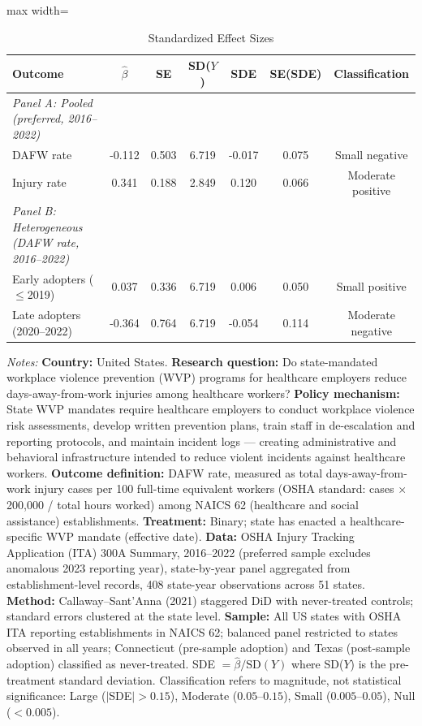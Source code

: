 \begin{table}[htbp]
\centering
\caption{Standardized Effect Sizes}
\label{tab:sde}
\begin{adjustbox}{max width=\textwidth}
\begin{tabular}{lcccccc}
\toprule
Outcome & $\hat{\beta}$ & SE & SD($Y$) & SDE & SE(SDE) & Classification \\
\midrule
\textit{Panel A: Pooled (preferred, 2016--2022)} & & & & & & \\
DAFW rate & -0.112 & 0.503 & 6.719 & -0.017 & 0.075 & Small negative \\
Injury rate & 0.341 & 0.188 & 2.849 & 0.120 & 0.066 & Moderate positive \\
\addlinespace
\textit{Panel B: Heterogeneous (DAFW rate, 2016--2022)} & & & & & & \\
Early adopters ($\leq$2019) & 0.037 & 0.336 & 6.719 & 0.006 & 0.050 & Small positive \\
Late adopters (2020--2022) & -0.364 & 0.764 & 6.719 & -0.054 & 0.114 & Moderate negative \\
\bottomrule
\end{tabular}
\end{adjustbox}
\begin{tablenotes}[flushleft]
\small
\item \textit{Notes:} \textbf{Country:} United States. \textbf{Research question:} Do state-mandated workplace violence prevention (WVP) programs for healthcare employers reduce days-away-from-work injuries among healthcare workers? \textbf{Policy mechanism:} State WVP mandates require healthcare employers to conduct workplace violence risk assessments, develop written prevention plans, train staff in de-escalation and reporting protocols, and maintain incident logs --- creating administrative and behavioral infrastructure intended to reduce violent incidents against healthcare workers. \textbf{Outcome definition:} DAFW rate, measured as total days-away-from-work injury cases per 100 full-time equivalent workers (OSHA standard: cases $\times$ 200,000 / total hours worked) among NAICS 62 (healthcare and social assistance) establishments. \textbf{Treatment:} Binary; state has enacted a healthcare-specific WVP mandate (effective date). \textbf{Data:} OSHA Injury Tracking Application (ITA) 300A Summary, 2016--2022 (preferred sample excludes anomalous 2023 reporting year), state-by-year panel aggregated from establishment-level records, 408 state-year observations across 51 states. \textbf{Method:} Callaway--Sant'Anna (2021) staggered DiD with never-treated controls; standard errors clustered at the state level. \textbf{Sample:} All US states with OSHA ITA reporting establishments in NAICS 62; balanced panel restricted to states observed in all years; Connecticut (pre-sample adoption) and Texas (post-sample adoption) classified as never-treated. SDE $= \hat{\beta} / \text{SD}(Y)$ where SD($Y$) is the pre-treatment standard deviation. Classification refers to magnitude, not statistical significance: Large ($|$SDE$| > 0.15$), Moderate ($0.05$--$0.15$), Small ($0.005$--$0.05$), Null ($< 0.005$).
\end{tablenotes}
\end{table}
